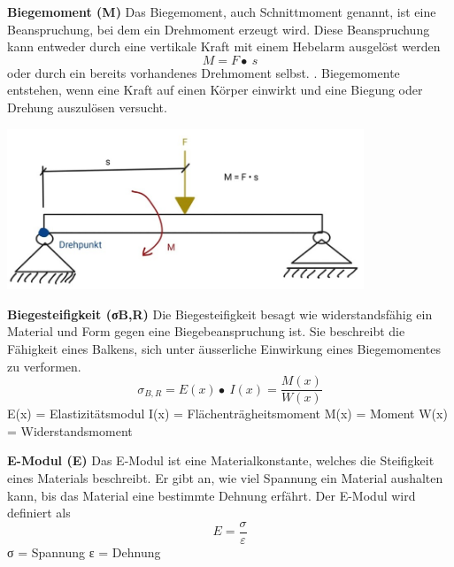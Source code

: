 \textbf{Biegemoment (M)}
Das Biegemoment, auch Schnittmoment genannt, ist eine Beanspruchung, bei dem ein Drehmoment erzeugt wird.
Diese Beanspruchung kann entweder durch eine vertikale Kraft mit einem Hebelarm ausgelöst werden
\begin{equation}
	M=
	F\bullet\ s
\end{equation}
\label{Formel für die Berechnung von Momenten}
oder durch ein bereits vorhandenes Drehmoment selbst.
. Biegemomente entstehen, wenn eine Kraft auf einen Körper einwirkt und eine Biegung oder Drehung auszulösen versucht.
\begin{center}
	\includegraphics[width=0.8\textwidth]{papers/balken/images/teil1/Biegemoment.jpg}
\end{center}
\label{Die Abbildung zeigt einen Balken, der von einer einzigen Last belastet wird, was zu auftretenden Momenten führt.}

\textbf{Biegesteifigkeit (σB,R)}
Die Biegesteifigkeit besagt wie widerstandsfähig ein Material und Form gegen eine Biegebeanspruchung ist.
Sie beschreibt die Fähigkeit eines Balkens, sich unter äusserliche Einwirkung eines Biegemomentes zu verformen.
\begin{equation}
	\sigma_{B,R}=
	E\left(x\right)\bullet\ I\left(x\right)=
	\frac{M(x)}{W(x)}
\end{equation}
\label{Formel für die Biegesteifigkeit einer Bauteils}
E(x) = Elastizitätsmodul
I(x) = Flächenträgheitsmoment
M(x) = Moment 
W(x) = Widerstandsmoment

\textbf{E-Modul (E)}
Das E-Modul ist eine Materialkonstante, welches die Steifigkeit eines Materials beschreibt.
Er gibt an, wie viel Spannung ein Material aushalten kann, bis das Material eine bestimmte Dehnung erfährt.
Der E-Modul wird definiert als
\begin{equation}
	E=
	\frac{\sigma}{\varepsilon}
\end{equation}
σ = Spannung
ε = Dehnung

